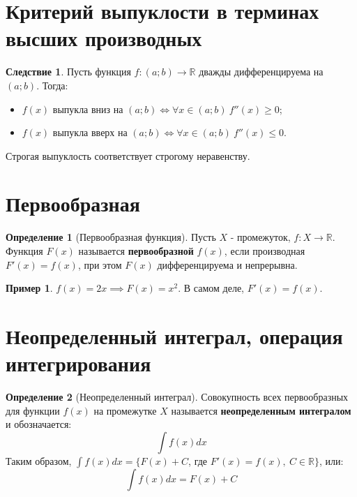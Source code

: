 \documentclass{report}
\theoremstyle{definition}
\newtheorem*{definition}{Определение}
\newtheorem*{example}{Пример}
\newtheorem*{effect}{Следствие}
\begin{document}
\section{Критерий выпуклости в терминах высших производных}

\begin{effect}
    Пусть функция $f:(a;b)\rightarrow \mathbb{R}$ дважды дифференцируема на $(a;b)$. Тогда:
    \begin{itemize}
        \item $f(x)$ выпукла вниз на $(a;b) \iff \forall x \in (a;b) \ f''(x) \geqslant 0$;
        \item $f(x)$ выпукла вверх на $(a;b) \iff \forall x \in (a;b) \ f''(x) \leqslant 0$.
    \end{itemize}

    Строгая выпуклость соответствует строгому неравенству.
\end{effect}

\section{Первообразная}

\begin{definition}[Первообразная функция]
    Пусть \(X\) - промежуток, \(f:X\rightarrow \mathbb{R}\). Функция \(F(x)\) называется
    \textbf{первообразной} \(f(x)\), если производная \(F'(x) = f(x)\), при этом \(F(x)\)
    дифференцируема и непрерывна.
\end{definition}

\begin{example}
    \(f(x) = 2x \implies F(x) = x^{2}\). В самом деле, \(F'(x) = f(x)\).
\end{example}

\section{Неопределенный интеграл, операция интегрирования}

\begin{definition}[Неопределенный интеграл]
    Совокупность всех первообразных для функции \(f(x)\) на промежутке \(X\) называется
    \textbf{неопределенным интегралом} и обозначается:
    \begin{equation*}
        \int f(x) dx
    \end{equation*}
    Таким образом, \(\int f(x) dx = \{F(x) + C\), где \(F'(x) = f(x), \ C \in \mathbb{R}\}\),
    или:
    \begin{equation*}
        \int f(x) dx = F(x) + C
    \end{equation*}
\end{definition}
\end{document}
